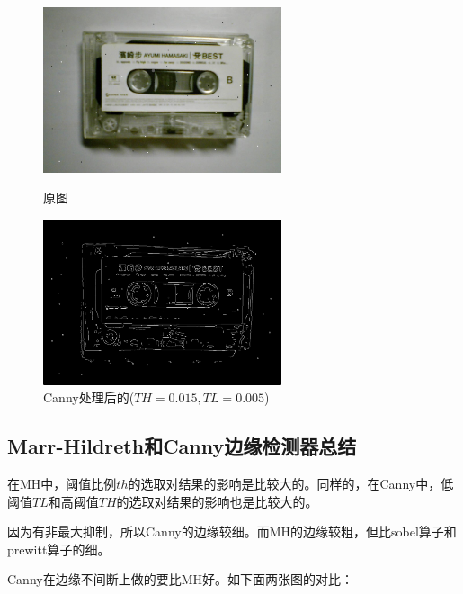 \documentclass[11pt, a4paper, UTF8]{ctexart}
\begin{document}
\begin{figure}[H]
  \centering
  \begin{minipage}[t]{0.48\textwidth}
  \centering
  \includegraphics[width=7cm]{noise.jpg}
  \caption{原图}
  \end{minipage}
  \begin{minipage}[t]{0.48\textwidth}
  \centering
  \includegraphics[width=7cm]{Canny_TH=0.015_TL=0.005_noise.png}
  \caption{Canny处理后的($TH=0.015,TL=0.005$)}
  \end{minipage}
\end{figure}


\subsection{Marr-Hildreth和Canny边缘检测器总结}
在MH中，阈值比例$th$的选取对结果的影响是比较大的。同样的，在Canny中，低阈值$TL$和高阈值$TH$的选取对结果的影响也是比较大的。

因为有非最大抑制，所以Canny的边缘较细。而MH的边缘较粗，但比sobel算子和prewitt算子的细。


Canny在边缘不间断上做的要比MH好。如下面两张图的对比：
\end{document}

